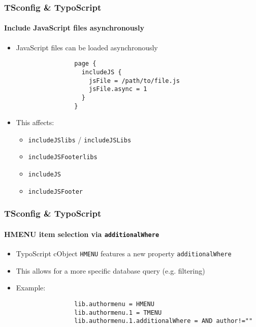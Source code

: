 \begin{frame}[fragile]
	\frametitle{TSconfig \& TypoScript}
	\framesubtitle{Include JavaScript files asynchronously}

	\begin{itemize}
		\item JavaScript files can be loaded asynchronously

			\begin{lstlisting}
				page {
				  includeJS {
				    jsFile = /path/to/file.js
				    jsFile.async = 1
				  }
				}
			\end{lstlisting}

		\item This affects:

			\begin{itemize}
				\item \texttt{includeJSlibs} / \texttt{includeJSLibs}
				\item \texttt{includeJSFooterlibs}
				\item \texttt{includeJS}
				\item \texttt{includeJSFooter}
			\end{itemize}

	\end{itemize}

\end{frame}


\begin{frame}[fragile]
	\frametitle{TSconfig \& TypoScript}
	\framesubtitle{HMENU item selection via \texttt{additionalWhere}}

	\begin{itemize}

		\item TypoScript cObject \texttt{HMENU} features a new property \texttt{additionalWhere}
		\item This allows for a more specific database query (e.g. filtering)

		\item Example:

			\begin{lstlisting}
				lib.authormenu = HMENU
				lib.authormenu.1 = TMENU
				lib.authormenu.1.additionalWhere = AND author!=""
			\end{lstlisting}

	\end{itemize}

\end{frame}

